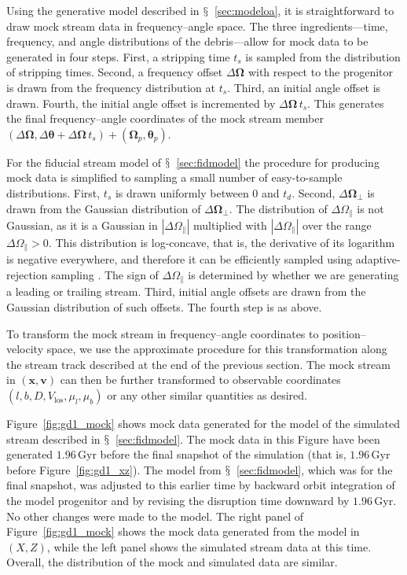 \documentclass[12pt,preprint]{aastex}
\renewcommand{\figurename}{Figure}
\newcommand{\sectionname}{$\mathsection$}
\renewcommand{\vec}[1]{\ensuremath{\mathbf{#1}}}
\newcommand{\vecx}{\ensuremath{\vec{x}}}
\newcommand{\vecv}{\ensuremath{\vec{v}}}
\newcommand{\veco}{\ensuremath{\vec{\Omega}}}
\newcommand{\veca}{\ensuremath{\boldsymbol\theta}}
\newcommand{\Gyr}{\ensuremath{\,\mathrm{Gyr}}}
\newcommand{\opar}{\ensuremath{\Omega_\parallel}}
\newcommand{\operp}{\ensuremath{\veco_\perp}}
\newcommand{\vlos}{\ensuremath{V_{\mathrm{los}}}}
\newcommand{\pmll}{\ensuremath{\mu_l}}
\newcommand{\pmbb}{\ensuremath{\mu_b}}
\begin{document}
Using the generative model described in
\sectionname~\ref{sec:modeloa}, it is straightforward to draw mock
stream data in frequency--angle space. The three ingredients---time,
frequency, and angle distributions of the debris---allow for mock data
to be generated in four steps. First, a stripping time $t_s$ is
sampled from the distribution of stripping times. Second, a frequency
offset $\Delta \veco$ with respect to the progenitor is drawn from the
frequency distribution at $t_s$. Third, an initial angle offset is
drawn. Fourth, the initial angle offset is incremented by $\Delta
\veco \,t_s$. This generates the final frequency--angle coordinates of
the mock stream member $(\Delta \veco,\Delta \veca+\Delta \veco\,t_s)
+ (\veco_p,\veca_p)$.

For the fiducial stream model of \sectionname~\ref{sec:fidmodel} the
procedure for producing mock data is simplified to sampling a small
number of easy-to-sample distributions. First, $t_s$ is drawn
uniformly between $0$ and $t_d$. Second, $\Delta \operp$ is drawn from
the Gaussian distribution of $\Delta \operp$. The distribution of
$\Delta \opar$ is not Gaussian, as it is a Gaussian in $|\Delta
\opar|$ multiplied with $|\Delta \opar|$ over the range $\Delta \opar
> 0$. This distribution is log-concave, that is, the derivative of its
logarithm is negative everywhere, and therefore it can be efficiently
sampled using adaptive-rejection sampling \citep{Gilks92a}. The sign
of $\Delta \opar$ is determined by whether we are generating a leading
or trailing stream. Third, initial angle offsets are drawn from the
Gaussian distribution of such offsets. The fourth step is as above.

To transform the mock stream in frequency--angle coordinates to
position--velocity space, we use the approximate procedure for this
transformation along the stream track described at the end of the
previous section. The mock stream in $(\vecx,\vecv)$ can then be
further transformed to observable coordinates
$(l,b,D,\vlos,\pmll,\pmbb)$ or any other similar quantities as
desired.

\figurename~\ref{fig:gd1_mock} shows mock data generated for the model
of the simulated stream described in
\sectionname~\ref{sec:fidmodel}. The mock data in this Figure have
been generated $1.96\Gyr$ before the final snapshot of the simulation
(that is, $1.96\Gyr$ before \figurename~\ref{fig:gd1_xz}). The model
from \sectionname~\ref{sec:fidmodel}, which was for the final
snapshot, was adjusted to this earlier time by backward orbit
integration of the model progenitor and by revising the disruption
time downward by $1.96\Gyr$. No other changes were made to the
model. The right panel of \figurename~\ref{fig:gd1_mock} shows the
mock data generated from the model in $(X,Z)$, while the left panel
shows the simulated stream data at this time. Overall, the
distribution of the mock and simulated data are similar.
\end{document}
